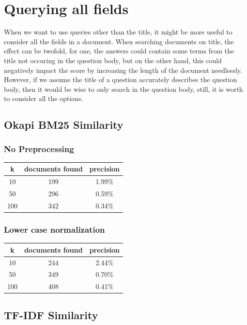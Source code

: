 \documentclass{article}
\begin{document}
\section{Querying all fields}
When we want to use queries other than the title, it might be more useful to consider all the fields in a document. When searching documents on title, the effect can be twofold, for one, the answers could contain some terms from the title not occuring in the question body, but on the other hand, this could negatively impact the score by increasing the length of the document needlessly. However, if we assume the title of a question accurately describes the question body, then it would be wise to only search in the question body, still, it is worth to consider all the options.

\subsection{Okapi BM25 Similarity}
\subsubsection{No Preprocessing}
\begin{center}
\begin{tabular}{|c|c|c|} \hline
\textbf{k} & \textbf{documents found} & \textbf{precision}\\ \hline
10 & 199 & 1.99\%\\
50 & 296 & 0.59\%\\
100 & 342 & 0.34\%\\ \hline
\end{tabular}
\end{center}
\subsubsection{Lower case normalization}

\begin{center}
\begin{tabular}{|c|c|c|} \hline
\textbf{k} & \textbf{documents found} & \textbf{precision}\\ \hline
10 & 244 & 2.44\%\\
50 & 349 & 0.70\%\\
100 & 408 & 0.41\%\\ \hline
\end{tabular}
\end{center}

\subsection{TF-IDF Similarity}
\end{document}
